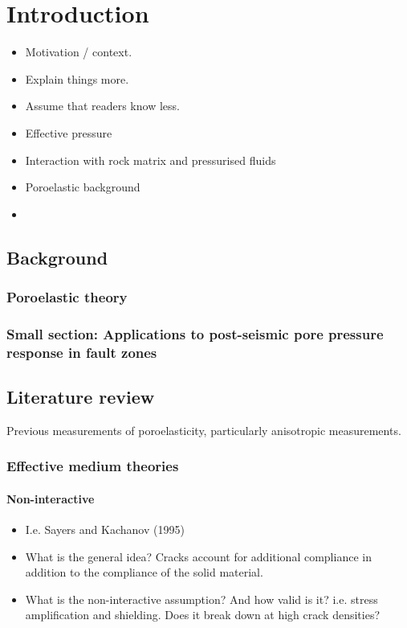 \chapter{Introduction}
\label{chapterlabel1}

\begin{itemize}
    \item Motivation / context.
    \item Explain things more.
    \item Assume that readers know less.
\end{itemize}

\begin{itemize}
    \item Effective pressure
    \item Interaction with rock matrix and pressurised fluids
    \item Poroelastic background
    \item
\end{itemize}


\section{Background}
\subsection{Poroelastic theory}
\subsection{Small section: Applications to post-seismic pore pressure response in fault zones}

\section{Literature review}
Previous measurements of poroelasticity, particularly anisotropic measurements.

\subsection{Effective medium theories}
\subsubsection{Non-interactive}
\begin{itemize}
    \item I.e. Sayers and Kachanov (1995)
    \item What is the general idea? Cracks account for additional compliance in addition to the compliance of the solid material.
    \item What is the non-interactive assumption? And how valid is it? i.e. stress amplification and shielding. Does it break down at high crack densities?
\end{itemize}
